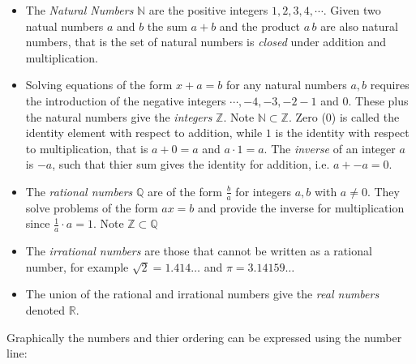 \documentclass{article}
\begin{document}
\begin{itemize}
\item The \emph{Natural Numbers} $\mathbb{N}$ are the positive integers $1,2,3,4,\cdots$. Given two natual numbers $a$ and $b$ the sum $a+b$ and the product $a\,b$ are also natural numbers, that is the set of natural numbers is \emph{closed} under addition and multiplication.

\item Solving equations of the form $x + a = b$ for any natural numbers $a,b$ requires the introduction of the negative integers $\cdots, -4, -3, -2 -1$ and $0$. These plus the natural numbers give the \emph{integers}  $\mathbb{Z}$. Note $\mathbb{N} \subset \mathbb{Z}$. Zero ($0$) is called the identity element with respect to addition, while $1$ is the identity with respect to multiplication, that is $a+0 = a$ and $ a \cdot 1 = a$. The \emph{inverse} of an integer $a$ is $-a$, such that thier sum gives the identity for addition, i.e. $a + -a = 0$.

\item The \emph{rational numbers} $\mathbb{Q}$ are of the form $\frac{b}{a}$ for integers $a,b$ with $a \neq 0$. They solve problems of the form $ax=b$ and provide the inverse for multiplication since $\frac{1}{a} \cdot a = 1$. Note $\mathbb{Z} \subset \mathbb{Q}$

\item The \emph{irrational numbers} are those that cannot be written as a rational number, for example $\sqrt{2} = 1.414\ldots$ and $\pi = 3.14159\ldots$

\item The union of the rational and irrational numbers give the \emph{real numbers} denoted $\mathbb{R}$.
\end{itemize}

Graphically the numbers and thier ordering can be expressed using the number line:
\end{document}
